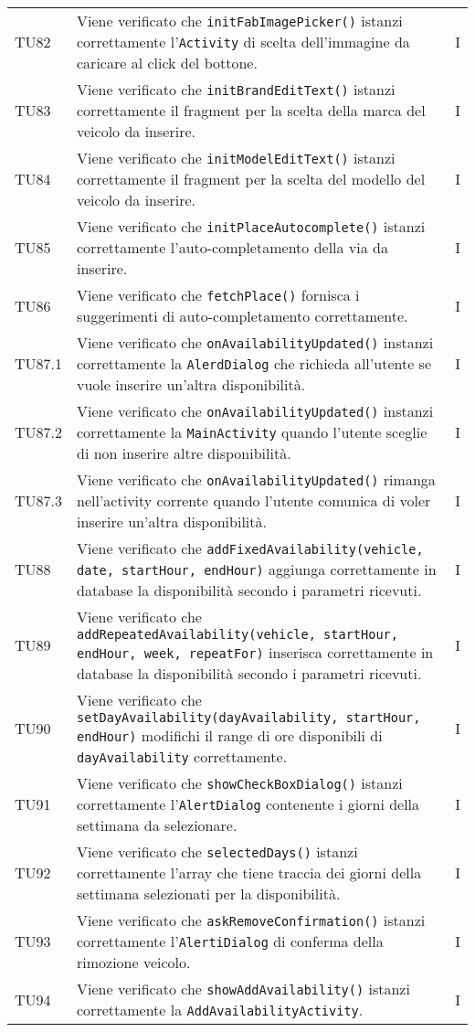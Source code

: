 \begin{longtable}{ >{\centering}p{}  >{\centering}p{} >{\centering}p{}
			}
		\tabularnewline	
		TU82 & Viene verificato che \texttt{initFabImagePicker()} istanzi correttamente l'\texttt{Activity} di scelta dell'immagine da caricare al click del bottone. & I 
		\tabularnewline	
		TU83 & Viene verificato che \texttt{initBrandEditText()} istanzi correttamente il fragment per la scelta della marca del veicolo da inserire. & I 
		\tabularnewline	
		TU84 & Viene verificato che \texttt{initModelEditText()} istanzi correttamente il fragment per la scelta del modello del veicolo da inserire. & I 
		\tabularnewline	
		TU85 & Viene verificato che \texttt{initPlaceAutocomplete()} istanzi correttamente l'auto-completamento della via da inserire. & I
		\tabularnewline	
		TU86 & Viene verificato che \texttt{fetchPlace()} fornisca i suggerimenti di auto-completamento correttamente. & I 
		\tabularnewline	
		TU87.1 & Viene verificato che \texttt{onAvailabilityUpdated()} instanzi correttamente la \texttt{AlerdDialog} che richieda all'utente se vuole inserire un'altra disponibilità. & I 
		\tabularnewline	
		TU87.2 & Viene verificato che \texttt{onAvailabilityUpdated()} instanzi correttamente la \texttt{MainActivity} quando l'utente sceglie di non inserire altre disponibilità. & I
		\tabularnewline	
		TU87.3 & Viene verificato che \texttt{onAvailabilityUpdated()} rimanga nell'activity corrente quando l'utente comunica di voler inserire un'altra disponibilità. & I
		\tabularnewline	
		TU88 & Viene verificato che \texttt{addFixedAvailability(vehicle, date, startHour, endHour)} aggiunga correttamente in database la disponibilità secondo i parametri ricevuti. & I 
		\tabularnewline	
		TU89 & Viene verificato che \texttt{addRepeatedAvailability(vehicle, startHour, endHour, week, repeatFor)} inserisca correttamente in database la disponibilità secondo i parametri ricevuti. & I 
		\tabularnewline	
		TU90 & Viene verificato che \texttt{setDayAvailability(dayAvailability, startHour, endHour)} modifichi il range di ore disponibili di \texttt{dayAvailability} correttamente. & I 
		\tabularnewline	
		TU91 & Viene verificato che \texttt{showCheckBoxDialog()} istanzi correttamente l'\texttt{AlertDialog} contenente i giorni della settimana da selezionare. & I 
		\tabularnewline	
		TU92 & Viene verificato che \texttt{selectedDays()} istanzi correttamente l'array che tiene traccia dei giorni della settimana selezionati per la disponibilità. & I 
		\tabularnewline	
		TU93 & Viene verificato che \texttt{askRemoveConfirmation()} istanzi correttamente l'\texttt{AlertiDialog} di conferma della rimozione veicolo. & I
		\tabularnewline	
		TU94 & Viene verificato che \texttt{showAddAvailability()} istanzi correttamente la \texttt{AddAvailabilityActivity}. & I 

\end{longtable}

